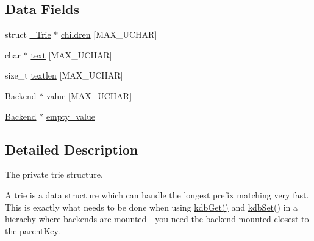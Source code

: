 \subsection*{Data Fields}
\begin{DoxyCompactItemize}
\item 
struct \hyperlink{struct__Trie}{\_\-Trie} $\ast$ \hyperlink{struct__Trie_ae60b70484c5b75a76a9d936c7e6b9370}{children} \mbox{[}MAX\_\-UCHAR\mbox{]}
\item 
char $\ast$ \hyperlink{struct__Trie_af6bc274ad09ef18de2495bdcdf86d54f}{text} \mbox{[}MAX\_\-UCHAR\mbox{]}
\item 
size\_\-t \hyperlink{struct__Trie_ae1f924ab4e6d8c7eb8064d7eae21bf3f}{textlen} \mbox{[}MAX\_\-UCHAR\mbox{]}
\item 
\hyperlink{struct__Backend}{Backend} $\ast$ \hyperlink{struct__Trie_acc978e56b19aa3c483b4e54755697380}{value} \mbox{[}MAX\_\-UCHAR\mbox{]}
\item 
\hyperlink{struct__Backend}{Backend} $\ast$ \hyperlink{struct__Trie_ac5c6b4bddcccb23eb0bd26ffade7eb43}{empty\_\-value}
\end{DoxyCompactItemize}


\subsection{Detailed Description}
The private trie structure.

A trie is a data structure which can handle the longest prefix matching very fast. This is exactly what needs to be done when using \hyperlink{group__kdb_ga28e385fd9cb7ccfe0b2f1ed2f62453a1}{kdbGet()} and \hyperlink{group__kdb_ga11436b058408f83d303ca5e996832bcf}{kdbSet()} in a hierachy where backends are mounted -\/ you need the backend mounted closest to the parentKey. 

